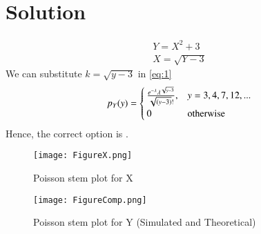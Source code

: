 \documentclass[journal,12pt,twocolumn]{IEEEtran}
\begin{document}
\section*{Solution}
\begin{align}
    Y = X^2 + 3\\
    X = \sqrt{Y - 3}
\end{align}
We can substitute $k = \sqrt{y-3}$ in \eqref{eq:1}
\begin{align}
p_Y(y) = 
    \begin{cases} 
      \frac{e^{-\lambda}\lambda^{\sqrt{y-3}}}{\sqrt{\left(y-3\right)}!}, & y=3,4,7,12,...\\
      0&\text{otherwise}
   \end{cases}
\end{align}
Hence, the correct option is .
\begin{figure}[hb]
    \centering
    \texttt{[image: FigureX.png]}
    \caption{Poisson stem plot for X }
    \label{fig:plot1}
\end{figure}
\begin{figure}[hb]
    \centering
    \texttt{[image: FigureComp.png]}
    \caption{Poisson stem plot for Y (Simulated and Theoretical) }
    \label{fig:plot3}
\end{figure}
\end{document}
